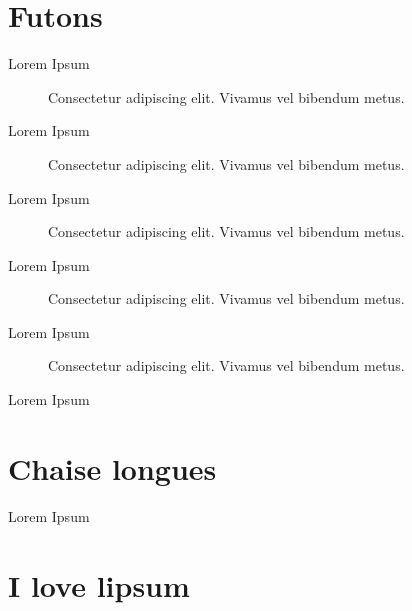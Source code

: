 \documentclass[]{viccuad-cv}
\begin{document}
\section{Futons}
	\begin{description}
		\item[Lorem Ipsum]
			Consectetur adipiscing elit. Vivamus vel bibendum metus.
		\item[Lorem Ipsum]
			Consectetur adipiscing elit. Vivamus vel bibendum metus.
		\item[Lorem Ipsum]
			Consectetur adipiscing elit. Vivamus vel bibendum metus.
		\item[Lorem Ipsum]
			Consectetur adipiscing elit. Vivamus vel bibendum metus.
		\item[Lorem Ipsum]
			Consectetur adipiscing elit. Vivamus vel bibendum metus.
		\item[Lorem Ipsum]
	\end{description}


\section{Chaise longues}
	\begin{description}
		\item[Lorem Ipsum]
	\end{description}


\section{I love lipsum}
%
\end{document}
